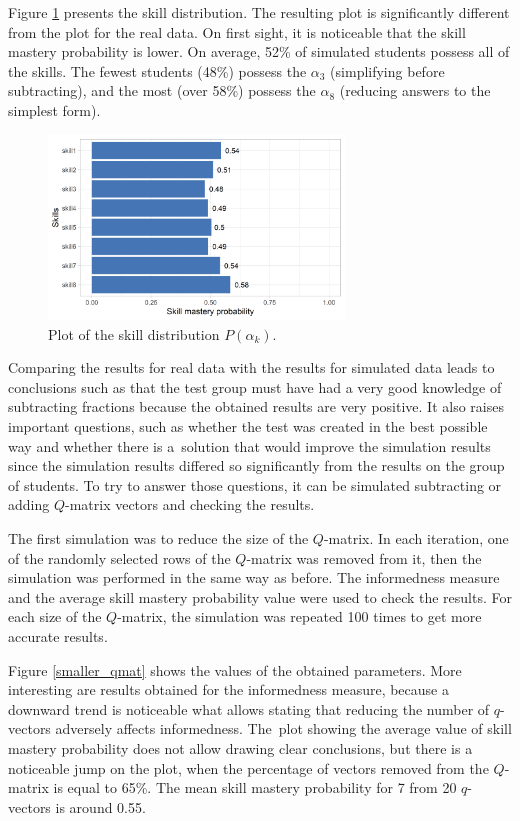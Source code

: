 \documentclass[english]{pwr_wmat_praca_dyplomowa}
\theoremstyle{plain}
\numberwithin{theorem}{chapter}
\theoremstyle{definition}
\numberwithin{theorem}{chapter}
\begin{document}
	Figure \ref{skill_possession_sim} presents the skill distribution. The resulting plot is significantly different from the plot for the real data. On first sight, it is noticeable that the skill mastery probability is lower. On average, 52\% of simulated students possess all of the skills. The fewest students (48\%) possess the $\alpha_3$ (simplifying before subtracting), and the most (over 58\%) possess the $\alpha_8$ (reducing answers to the simplest form). 
	
	\begin{figure}[h!]
		\centering
		\includegraphics[width=0.7\textwidth]{Skill_mastery_probability_sim.png}
		\caption{Plot of the skill distribution $P(\alpha_k)$.}
		\label{skill_possession_sim}
	\end{figure}
	
	Comparing the results for real data with the results for simulated data leads to conclusions such as that the test group must have had a very good knowledge of subtracting fractions because the obtained results are very positive. It also raises important questions, such as whether the test was created in the best possible way and whether there is a~solution that would improve the simulation results since the simulation results differed so significantly from the results on the group of students. To try to answer those questions, it can be simulated subtracting or adding $Q$-matrix vectors and checking the results.
	
	The first simulation was to reduce the size of the $Q$-matrix. In each iteration, one of the randomly selected rows of the $Q$-matrix was removed from it, then the simulation was performed in the same way as before. The informedness measure and the average skill mastery probability value were used to check the results. For each size of the $Q$-matrix, the simulation was repeated 100 times to get more accurate results. 
	
	Figure \ref{smaller_qmat} shows the values of the obtained parameters. More interesting are results obtained for the informedness measure, because a downward trend is noticeable what allows stating that reducing the number of $q$-vectors adversely affects informedness. The~plot showing the average value of skill mastery probability does not allow drawing clear conclusions, but there is a noticeable jump on the plot, when the percentage of vectors removed from the $Q$-matrix is equal to 65\%. The mean skill mastery probability for 7 from 20 $q$-vectors is around 0.55.
	
\end{document}
